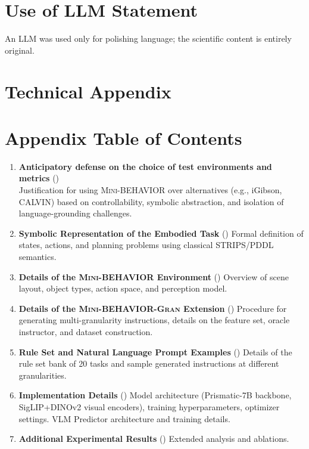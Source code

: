 \documentclass[11pt]{article}
\begin{document}
%


\appendix

\section{Use of LLM Statement} 
An LLM was used only for polishing language; the scientific content is entirely original.


\section{Technical Appendix}

\section*{Appendix Table of Contents}
\begin{enumerate}[leftmargin=*]
    \item \textbf{Anticipatory defense on the choice of test environments and metrics} () \\
    Justification for using \textsc{Mini-BEHAVIOR} over alternatives (e.g., iGibson, CALVIN) based on controllability, symbolic abstraction, and isolation of language-grounding challenges.
    \item \textbf{Symbolic Representation of the Embodied Task} ()
    Formal definition of states, actions, and planning problems using classical STRIPS/PDDL semantics.
    \item \textbf{Details of the \textsc{Mini-BEHAVIOR} Environment} ()
    Overview of scene layout, object types, action space, and perception model.
    \item \textbf{Details of the \textsc{Mini-BEHAVIOR-Gran} Extension} ()
    Procedure for generating multi-granularity instructions, details on the feature set, oracle instructor, and dataset construction.
    \item \textbf{Rule Set and Natural Language Prompt Examples} ()
    Details of the rule set bank of 20 tasks and sample generated instructions at different granularities.
    \item \textbf{Implementation Details} ()
    Model architecture (Prismatic-7B backbone, SigLIP+DINOv2 visual encoders), training hyperparameters, optimizer settings. VLM Predictor architecture and training details.
    \item \textbf{Additional Experimental Results} ()
    Extended analysis and ablations.
\end{enumerate}


\end{document}
